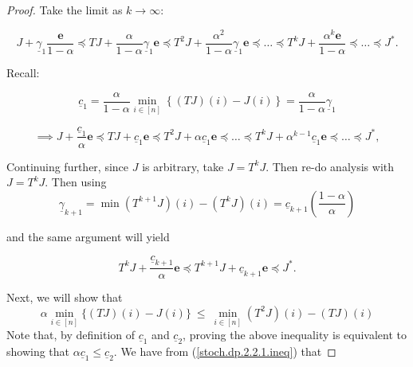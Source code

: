 \begin{enumerate}
\begin{proof}
Take the limit as \( k \to \infty\):

\[
J + \underline{\gamma}_{1} \frac{\boldsymbol{e}}{1 - \alpha} \preceq TJ + \frac{\alpha}{1 - \alpha} \underline{\gamma}_{1}\boldsymbol{e}\preceq T^2 J + \frac{\alpha^2}{1 - \alpha} \underline{\gamma}_{1}\boldsymbol{e}\preceq \ldots \preceq T^k J + \frac{\alpha^k \boldsymbol{e}}{1 - \alpha} \preceq \ldots \preceq J^*.
\]

Recall: 

\[
\underline{c}_1 = \frac{\alpha}{1 - \alpha} \min_{i \in [n]} \left\{ (TJ)(i) - J(i) \right\} = \frac{\alpha}{1- \alpha}  \underline{\gamma}_{1}
\]

\begin{equation}\label{stoch.dp.2.2.1.ineq}
\implies J + \frac{\underline{c}_1}{\alpha}\boldsymbol{e}\preceq TJ + \underline{c}_1\boldsymbol{e}\preceq T^2 J + \alpha \underline{c}_1\boldsymbol{e}\preceq  \ldots \preceq T^k J + \alpha^{k-1} \underline{c}_1\boldsymbol{e} \preceq \ldots \preceq J^*,
\end{equation}

%
 
Continuing further, since \(J\) is arbitrary, take \(J = T^kJ\). Then re-do analysis with \(J = T^k J\). Then using
\[
\underline{\gamma}_{k+1} = \min(T^{k+1}J)(i) - (T^kJ)(i) = \underline{c}_{k+1} \left(  \frac{1-\alpha}{\alpha} \right)
\]

and the same argument will yield 


\begin{equation}\label{stoch.dp.2.2.1.ineq2}
T^k J + \frac{\underline{c}_{k+1}}{\alpha}\boldsymbol{e} \preceq T^{k+1}J + \underline{c}_{k+1}\boldsymbol{e} \preceq J^*.
\end{equation}

Next, we will show that
$$
\alpha \min_{i \in [n]} \{ (TJ)(i) - J(i)\} ~\leq~ \min_{i \in [n]} (T^2J)(i) - (TJ)(i) 	
$$
Note that, by definition of $\underline{c}_1$ and $\underline{c}_2$, proving the above inequality is equivalent to showing that $\alpha \underline{c}_1 \leq \underline{c}_2$. We have from (\ref{stoch.dp.2.2.1.ineq}) that


\end{proof}
\end{enumerate}
